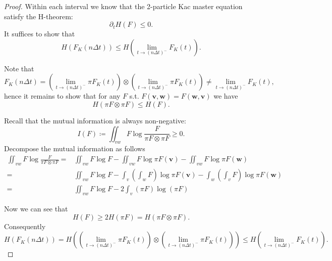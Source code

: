 \documentclass{article}
\numberwithin{equation}{section}
\begin{document}
\begin{proof}
    Within each interval we know that the 2-particle Kac master equation satisfy the H-theorem:
    \begin{equation*}
        \partial_{t} H(F) \leq 0.
    \end{equation*}
    It suffices to show that
    \begin{equation*}
        H\left(F_{K}(n\Delta t)\right)  \leq H\left(\lim_{t\rightarrow (n\Delta t)^{-}} F_{K}(t)\right).
    \end{equation*}

    Note that
    \begin{equation*}
        F_{K}(n\Delta t) = \left( \lim_{t\rightarrow (n\Delta t)^{-}}\pi F_{K}(t)\right) \otimes \left( \lim_{t\rightarrow (n\Delta t)^{-}}\pi F_{K}(t)\right) \neq \lim_{t\rightarrow (n\Delta t)^{-}} F_{K}(t),
    \end{equation*}
    hence it remains to show that for any $F$ s.t. $F(\mathbf{v}, \mathbf{w}) = F(\mathbf{w}, \mathbf{v})$ we have
    \begin{equation*}
        H(\pi F \otimes \pi F) \leq H(F).
    \end{equation*}

    Recall that the mutual information is always non-negative:
    \begin{equation*}
        I(F) \coloneqq \iint_{vw} F \log{\frac{F}{\pi F\otimes \pi F}} \geq 0.
    \end{equation*}
    Decompose the mutual information as follows
    \begin{equation*}
    \begin{split}
\iint_{vw} F \log{\frac{F}{\pi F\otimes \pi F}} = &\iint_{vw}F\log{F} - \iint_{vw} F \log{\pi F(\mathbf{v})} - \iint_{vw} F \log{\pi F(\mathbf{w})}\\
=& \iint_{vw}F\log{F} - \int_{v} \left(\int_{w}F\right) \log{\pi F(\mathbf{v})} - \int_{w} \left(\int_{v}F\right) \log{\pi F(\mathbf{w})}\\
=& \iint_{vw}F\log{F} - 2\int_{v} (\pi F) \log{(\pi F)}
    \end{split}
    \end{equation*}

    Now we can see that 
    \begin{equation*}
        H(F) \geq 2 H(\pi F) = H(\pi F \otimes \pi F).
    \end{equation*}
    Consequently
    \begin{equation*}
        H\left(F_{K}(n\Delta t)\right) = H\left(\left( \lim_{t\rightarrow (n\Delta t)^{-}}\pi F_{K}(t)\right) \otimes \left( \lim_{t\rightarrow (n\Delta t)^{-}}\pi F_{K}(t)\right)\right) \leq H\left(\lim_{t\rightarrow (n\Delta t)^{-}} F_{K}(t)\right).
    \end{equation*}


\end{proof}
\end{document}

